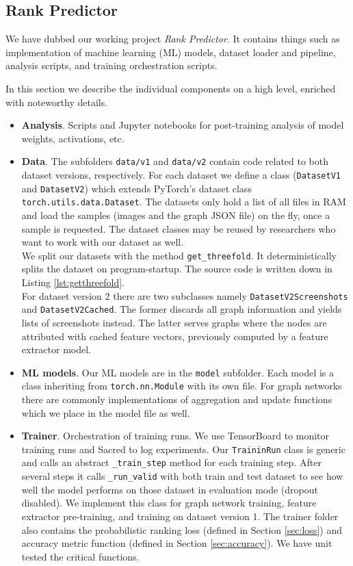 \subsection{Rank Predictor}

We have dubbed our working project \textit{Rank Predictor}. It contains things such as implementation of machine learning (ML) models, dataset loader and pipeline, analysis scripts, and training orchestration scripts.

In this section we describe the individual components on a high level, enriched with noteworthy details.

\begin{itemize}
    \item \textbf{Analysis}. Scripts and Jupyter notebooks for post-training analysis of model weights, activations, etc.
    \item \textbf{Data}. The subfolders \texttt{data/v1} and \texttt{data/v2} contain code related to both dataset versions, respectively. For each dataset we define a class (\texttt{DatasetV1} and \texttt{DatasetV2}) which extends PyTorch's dataset class \texttt{torch.utils.data.Dataset}. The datasets only hold a list of all files in RAM and load the samples (images and the graph JSON file) on the fly, once a sample is requested. The dataset classes may be reused by researchers who want to work with our dataset as well.\\
    We split our datasets with the method \texttt{get\_threefold}. It deterministically splits the dataset on program-startup. The source code is written down in Listing \ref{lst:getthreefold}.\\
    For dataset version 2 there are two subclasses namely \texttt{DatasetV2Screenshots} and \texttt{DatasetV2Cached}. The former discards all graph information and yields lists of screenshots instead. The latter serves graphs where the nodes are attributed with cached feature vectors, previously computed by a feature extractor model.
    \item \textbf{ML models}. Our ML models are in the \texttt{model} subfolder. Each model is a class inheriting from \texttt{torch.nn.Module} with its own file. For graph networks there are commonly implementations of aggregation and update functions which we place in the model file as well.
    \item \textbf{Trainer}. Orchestration of training runs. We use TensorBoard to monitor training runs and Sacred to log experiments. Our \texttt{TraininRun} class is generic and calls an abstract \texttt{\_train\_step} method for each training step. After several steps it calls \texttt{\_run\_valid} with both train and test dataset to see how well the model performs on those dataset in evaluation mode (dropout disabled). We implement this class for graph network training, feature extractor pre-training, and training on dataset version 1. The trainer folder also contains the probabilistic ranking loss (defined in Section \ref{sec:loss}) and accuracy metric function (defined in Section \ref{sec:accuracy}). We have unit tested the critical functions.
\end{itemize}

